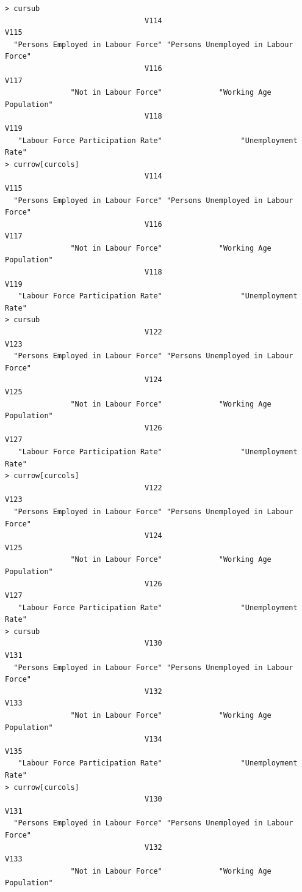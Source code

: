 \documentclass[a4paper]{article}
\begin{document}
\begin{verbatim}
> cursub 
                                V114                                 V115 
  "Persons Employed in Labour Force" "Persons Unemployed in Labour Force" 
                                V116                                 V117 
               "Not in Labour Force"             "Working Age Population" 
                                V118                                 V119 
   "Labour Force Participation Rate"                  "Unemployment Rate" 
> currow[curcols] 
                                V114                                 V115 
  "Persons Employed in Labour Force" "Persons Unemployed in Labour Force" 
                                V116                                 V117 
               "Not in Labour Force"             "Working Age Population" 
                                V118                                 V119 
   "Labour Force Participation Rate"                  "Unemployment Rate" 
> cursub 
                                V122                                 V123 
  "Persons Employed in Labour Force" "Persons Unemployed in Labour Force" 
                                V124                                 V125 
               "Not in Labour Force"             "Working Age Population" 
                                V126                                 V127 
   "Labour Force Participation Rate"                  "Unemployment Rate" 
> currow[curcols] 
                                V122                                 V123 
  "Persons Employed in Labour Force" "Persons Unemployed in Labour Force" 
                                V124                                 V125 
               "Not in Labour Force"             "Working Age Population" 
                                V126                                 V127 
   "Labour Force Participation Rate"                  "Unemployment Rate" 
> cursub 
                                V130                                 V131 
  "Persons Employed in Labour Force" "Persons Unemployed in Labour Force" 
                                V132                                 V133 
               "Not in Labour Force"             "Working Age Population" 
                                V134                                 V135 
   "Labour Force Participation Rate"                  "Unemployment Rate" 
> currow[curcols] 
                                V130                                 V131 
  "Persons Employed in Labour Force" "Persons Unemployed in Labour Force" 
                                V132                                 V133 
               "Not in Labour Force"             "Working Age Population" 

\end{verbatim}
\end{document}
